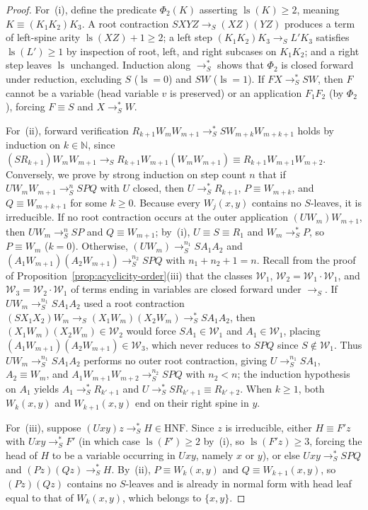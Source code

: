 \documentclass[11pt,reqno]{amsart}
\numberwithin{equation}{section}
\theoremstyle{plain}
\theoremstyle{definition}
\theoremstyle{remark}
\DeclareMathOperator{\ls}{ls}
\newcommand{\HNF}{\mathrm{HNF}}
\newcommand{\redS}{\to_S}
\newcommand{\redSs}{\to_S^*}
\begin{document}
\begin{proof}
For~(i), define the predicate $\Phi_2(K)$ asserting $\ls(K) \ge 2$, meaning $K \equiv (K_1 K_2) K_3$. A root contraction $S X Y Z \redS (X Z)(Y Z)$ produces a term of left-spine arity $\ls(X Z) + 1 \ge 2$; a left step $(K_1 K_2) K_3 \redS L' K_3$ satisfies $\ls(L') \ge 1$ by inspection of root, left, and right subcases on $K_1 K_2$; and a right step leaves $\ls$ unchanged. Induction along $\redSs$ shows that $\Phi_2$ is closed forward under reduction, excluding $S$ ($\ls = 0$) and $S W$ ($\ls = 1$). If $F X \redSs S W$, then $F$ cannot be a variable (head variable $v$ is preserved) or an application $F_1 F_2$ (by $\Phi_2$), forcing $F \equiv S$ and $X \redSs W$.

For~(ii), forward verification $R_{k+1} W_m W_{m+1} \redSs S W_{m+k} W_{m+k+1}$ holds by induction on $k \in \mathbb{N}$, since $(S R_{k+1}) W_m W_{m+1} \redS R_{k+1} W_{m+1} (W_m W_{m+1}) \equiv R_{k+1} W_{m+1} W_{m+2}$. Conversely, we prove by strong induction on step count $n$ that if $U W_m W_{m+1} \redS^n S P Q$ with $U$ closed, then $U \redSs R_{k+1}$, $P \equiv W_{m+k}$, and $Q \equiv W_{m+k+1}$ for some $k \ge 0$. Because every $W_j(x, y)$ contains no $S$-leaves, it is irreducible. If no root contraction occurs at the outer application $(U W_m) W_{m+1}$, then $U W_m \redS^n S P$ and $Q \equiv W_{m+1}$; by~(i), $U \equiv S \equiv R_1$ and $W_m \redSs P$, so $P \equiv W_m$ ($k = 0$). Otherwise, $(U W_m) \redS^{n_1} S A_1 A_2$ and $(A_1 W_{m+1})(A_2 W_{m+1}) \redS^{n_2} S P Q$ with $n_1 + n_2 + 1 = n$. Recall from the proof of Proposition~\ref{prop:acyclicity-order}(iii) that the classes $\mathcal{W}_1$, $\mathcal{W}_2 = \mathcal{W}_1 \cdot \mathcal{W}_1$, and $\mathcal{W}_3 = \mathcal{W}_2 \cdot \mathcal{W}_1$ of terms ending in variables are closed forward under $\redS$. If $U W_m \redS^{n_1} S A_1 A_2$ used a root contraction $(S X_1 X_2) W_m \redS (X_1 W_m)(X_2 W_m) \redSs S A_1 A_2$, then $(X_1 W_m)(X_2 W_m) \in \mathcal{W}_2$ would force $S A_1 \in \mathcal{W}_1$ and $A_1 \in \mathcal{W}_1$, placing $(A_1 W_{m+1})(A_2 W_{m+1}) \in \mathcal{W}_3$, which never reduces to $S P Q$ since $S \notin \mathcal{W}_1$. Thus $U W_m \redS^{n_1} S A_1 A_2$ performs no outer root contraction, giving $U \redS^{n_1} S A_1$, $A_2 \equiv W_m$, and $A_1 W_{m+1} W_{m+2} \redS^{n_2} S P Q$ with $n_2 < n$; the induction hypothesis on $A_1$ yields $A_1 \redSs R_{k'+1}$ and $U \redSs S R_{k'+1} \equiv R_{k'+2}$. When $k \ge 1$, both $W_k(x, y)$ and $W_{k+1}(x, y)$ end on their right spine in $y$.

For~(iii), suppose $(U x y) z \redSs H \in \HNF$. Since $z$ is irreducible, either $H \equiv F' z$ with $U x y \redSs F'$ (in which case $\ls(F') \ge 2$ by~(i), so $\ls(F' z) \ge 3$, forcing the head of $H$ to be a variable occurring in $U x y$, namely $x$ or $y$), or else $U x y \redSs S P Q$ and $(P z)(Q z) \redSs H$. By~(ii), $P \equiv W_k(x, y)$ and $Q \equiv W_{k+1}(x, y)$, so $(P z)(Q z)$ contains no $S$-leaves and is already in normal form with head leaf equal to that of $W_k(x, y)$, which belongs to $\{x, y\}$.
\end{proof}
\end{document}
